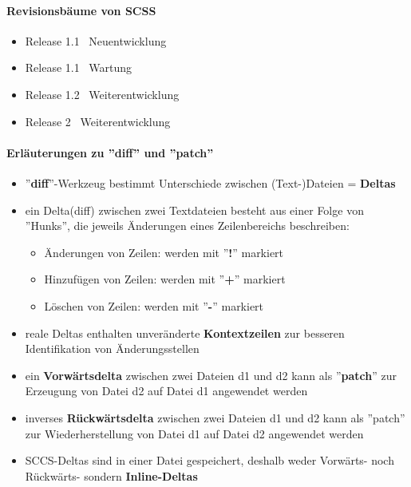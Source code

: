 \paragraph{Revisionsbäume von SCSS}
\begin{itemize}
	\item Release 1.1 \ Neuentwicklung
	\item Release 1.1 \ Wartung
	\item Release 1.2 \ Weiterentwicklung
	\item Release 2 \ Weiterentwicklung
\end{itemize}
\paragraph{Erläuterungen zu ''diff'' und ''patch''}
\begin{itemize}
	\item ''\textbf{diff}''-Werkzeug bestimmt Unterschiede zwischen (Text-)Dateien = \textbf{Deltas}
	\item ein Delta(diff) zwischen zwei Textdateien besteht aus einer Folge von ''Hunks'', die jeweils Änderungen eines Zeilenbereichs beschreiben:
	\begin{itemize}
		\item Änderungen von Zeilen: werden mit ''\textbf{!}'' markiert
		\item Hinzufügen von Zeilen: werden mit ''\textbf{+}'' markiert
		\item Löschen von Zeilen: werden mit ''\textbf{-}'' markiert
	\end{itemize}
	\item reale Deltas enthalten unveränderte \textbf{Kontextzeilen} zur besseren Identifikation von Änderungsstellen
	\item ein \textbf{Vorwärtsdelta} zwischen zwei Dateien d1 und d2 kann als ''\textbf{patch}'' zur Erzeugung von Datei d2 auf Datei d1 angewendet werden
	\item inverses \textbf{Rückwärtsdelta} zwischen zwei Dateien d1 und d2 kann als ''patch'' zur Wiederherstellung von Datei d1 auf Datei d2 angewendet werden
	\item SCCS-Deltas sind in einer Datei gespeichert, deshalb weder Vorwärts- noch Rückwärts- sondern \textbf{Inline-Deltas}
\end{itemize}
